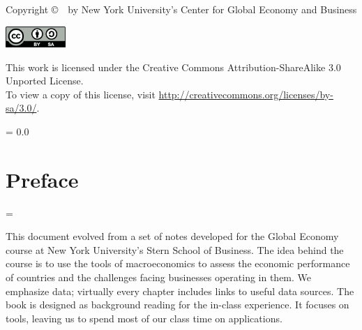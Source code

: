 \begin{titlepage}
Copyright \copyright \ \number\year \ by New York University's Center for Global Economy and Business

\begin{minipage}{0.9in}
\begin{flushleft}
\includegraphics[width=0.9in]{Figures/by_sa.pdf}\\
\vfill
\vspace{0.37in}
\phantom{m}
\end{flushleft}
\end{minipage}
\hspace{0.1in}
%
\begin{minipage}{0.70\textwidth}
\begin{flushleft}
 This work is licensed under the Creative Commons Attribution-ShareAlike 3.0 Unported License.\\
 \vspace{0.15in}
 To view a copy of this license, visit \url{http://creativecommons.org/licenses/by-sa/3.0/}.\\
 \end{flushleft}
\end{minipage}
\end{titlepage}


\parskip = 0.0\bigskipamount
\tableofcontents

\chapter*{Preface}
\parskip = \bigskipamount

This document evolved from a set of notes developed
for the Global Economy course at New York
University's Stern School of Business.
The idea behind the course is to use the tools of macroeconomics
to assess the economic performance of countries
and the challenges facing businesses operating in them.
We emphasize data;
virtually every chapter includes links to useful data sources.
The book is designed as background reading for the in-class experience.
It focuses on tools,
leaving us to spend most of our class time on applications.

